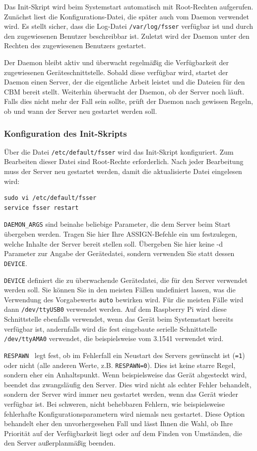 \documentclass[10pt,a4paper]{scrartcl}		%
\begin{document}
Das Init-Skript wird beim Systemstart automatisch mit Root-Rechten
aufgerufen. Zunächst liest die Konfigurations-Datei, die später
auch vom Daemon verwendet wird. Es stellt sicher, dass
die Log-Datei \texttt{/var/log/fsser} verfügbar ist und durch
den zugewiesenen Benutzer beschreibbar ist. Zuletzt wird der
Daemon unter den Rechten des zugewiesenen Benutzers gestartet.

Der Daemon bleibt aktiv und überwacht regelmäßig die Verfügbarkeit der zugewiesenen
Geräteschnittstelle. Sobald diese verfügbar wird, startet der Daemon einen
Server, der die eigentliche Arbeit leistet und die Dateien für
den CBM bereit stellt.
Weiterhin überwacht der Daemon, ob der Server noch läuft.
Falls dies nicht mehr der Fall sein sollte, prüft der Daemon nach gewissen Regeln,
ob und wann der Server neu gestartet werden soll.

\subsubsection*{Konfiguration des Init-Skripts}
Über die Datei \texttt{/etc/default/fsser} wird das Init-Skript
konfiguriert. Zum Bearbeiten dieser Datei sind Root-Rechte erforderlich.
Nach jeder Bearbeitung muss der Server neu gestartet werden, damit die
aktualisierte Datei eingelesen wird:

\begin{verbatim}
sudo vi /etc/default/fsser
service fsser restart
\end{verbatim}

\texttt{DAEMON\_ARGS}  sind beinahe beliebige Parameter,
die dem Server beim Start übergeben werden.
Tragen Sie hier Ihre ASSIGN-Befehle ein um festzulegen, welche Inhalte der
Server bereit stellen soll.
Übergeben Sie hier keine -d Parameter zur Angabe der Gerätedatei,
sondern verwenden Sie statt dessen \texttt{DEVICE}.

\texttt{DEVICE}  definiert die zu überwachende Gerätedatei, die für den
Server verwendet werden soll. Sie können Sie in den meisten Fällen undefiniert
lassen, was die Verwendung des Vorgabewerts \texttt{auto} bewirken wird.
Für die meisten Fälle wird dann \texttt{/dev/ttyUSB0} verwendet werden.
Auf dem Raspberry Pi wird diese Schnittstelle ebenfalls verwendet, wenn das
Gerät beim Systemstart bereits verfügbar ist, andernfalls wird die
fest eingebaute serielle Schnittstelle \texttt{/dev/ttyAMA0} verwendet, die
beispielsweise vom 3.1541 verwendet wird.

\texttt{RESPAWN}\  legt fest, ob im Fehlerfall ein Neustart des Servers
gewünscht ist (\texttt{=1}) oder nicht (alle anderen Werte,
z.B. \texttt{RESPAWN=0}). Dies ist keine starre Regel, sondern eher ein
Anhaltspunkt. Wenn beispielsweise das Gerät abgesteckt wird, beendet das
zwangsläufig den Server. Dies wird nicht als echter Fehler behandelt,
sondern der Server wird immer neu gestartet werden, wenn das Gerät wieder
verfügbar ist. Bei schweren, nicht behebbaren Fehlern, wie beispielsweise
fehlerhafte Konfigurationsparametern wird niemals neu gestartet.
Diese Option behandelt eher den unvorhergesehen Fall und lässt Ihnen die
Wahl, ob Ihre Priorität auf der Verfügbarkeit liegt oder auf dem Finden
von Umständen, die den Server außerplanmäßig beenden.
\end{document}
